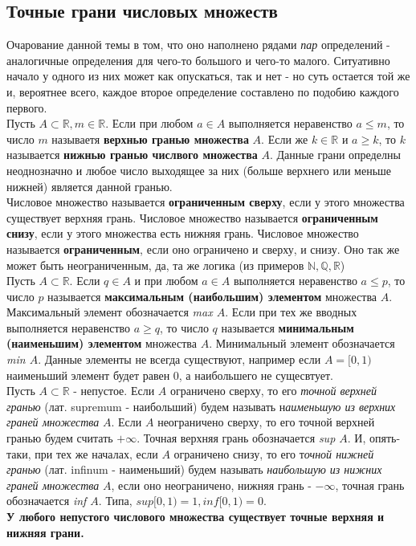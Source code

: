 \documentclass[10pt, a4paper,twocolumn]{article}
\begin{document}
\subsection{Точные грани числовых множеств}
Очарование данной темы в том, что оно наполнено рядами \textsl{пар} определений - аналогичные определения для чего-то большого и чего-то малого. Ситуативно начало у одного из них может как опускаться, так и нет - но суть остается той же и, вероятнее всего, каждое второе определение составлено по подобию каждого первого.
\\ Пусть $A \subset \mathbb{R}, m \in \mathbb{R}$. Если при любом $a \in A$ выполняется неравенство $a \leq m$, то число $m$ называетя \textbf{верхнью гранью множества} $A$. Если же $k \in \mathbb{R}$ и $a \geq k$, то $k$ называется \textbf{нижнью гранью числвого множества} $A$. Данные грани определны неоднозначно и любое число выходящее за них (больше верхнего или меньше нижней) является данной гранью.
\\ Числовое множество называется \textbf{ограниченным сверху}, если у этого множества существует верхняя грань. Числовое множество называется \textbf{ограниченным снизу}, если у этого множества есть нижняя грань. Числовое множество называется \textbf{ограниченным}, если оно ограничено и сверху, и снизу. Оно так же может быть неограниченным, да, та же логика (из примеров $\mathbb{N, Q, R}$)
\\Пусть $A \subset \mathbb{R}$. Если $q \in A$ и при любом $a \in A$ выполняется неравенство $a \leq p$, то число $p$ называется \textbf{максимальным (наибольшим) элементом} множества $A$. Максимальный элемент обозначается \textsl{max $A$}. Если при тех же вводных выполняется неравенство $a \geq q$, то число $q$ называется \textbf{минимальным (наименьшим) элементом} множества $A$. Минимальный элемент обозначается \textsl{min $A$}. Данные элементы не всегда существуют, например если $A = [0, 1)$ наименьший элемент будет равен 0, а наибольшего не сущесвтует.
\\Пусть $A \subset \mathbb{R}$ - непустое. Если $A$ ограничено сверху, то его \textsl{точной верхней гранью} (лат. supremum - наибольший) будем называть н\textsl{аименьшую из верхних граней множества} $A$. Если $A$ неограничено сверху, то его точной верхней гранью будем считать $+\infty$. Точная верхняя грань обозначается \textsl{sup $A$}. И, опять-таки, при тех же началах, если $A$ ограничено снизу, то его т\textsl{очной нижней гранью} (лат. infinum - наименьший) будем называть \textsl{наибольшую из нижних граней множества} $A$, если оно неограничено, нижняя грань - $-\infty$, точная грань обозначается \textsl{inf $A$}. Типа, $sup[0, 1) = 1, inf[0, 1) = 0$. 
\\\textbf{У любого непустого числового множества существует точные верхняя и нижняя грани.}
\end{document}
